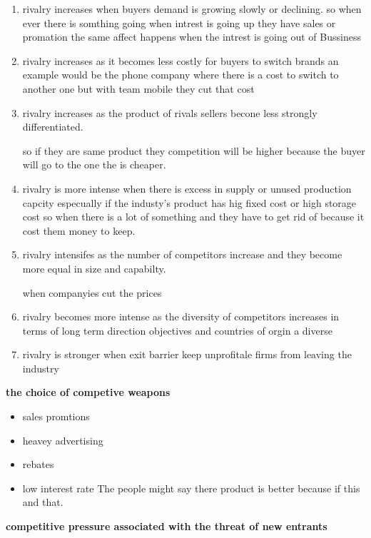 \documentclass{report}
\begin{document}
\begin{enumerate}
\item rivalry increases when buyers demand is growing slowly or declining.
so when ever there is somthing going when intrest is going up they have sales or promation the same affect happens when the intrest is going out of Bussiness 
\item rivalry increases as it becomes less costly for buyers to switch brands 
an example would be the phone company where there is a cost to switch to another one but with team mobile they cut that cost 
\item rivalry increases as the product of rivals sellers becone less strongly differentiated. 

so if they are same product they competition will be higher because the buyer will go to the one the is cheaper. 
\item rivalry is more intense when there is excess in supply or unused production capcity especually if the industy's product has hig fixed cost or high storage cost 
so when there is a lot of something and they have to get rid of because it cost them money to keep. 
\item rivalry intensifes as the number of competitors increase and they become more equal in size and capabilty. 

when companyies cut the prices 
\item rivalry becomes more intense as the diversity of competitors increases in terms  of long term direction objectives and countries of orgin a diverse 

\item rivalry is stronger when exit barrier keep unprofitale firms from leaving the industry 



\end{enumerate}

\textbf{the choice of competive weapons}
\begin{itemize}
\item sales promtions 
\item heavey advertising 
\item rebates 
\item low interest rate 
The people might say there product is better because if this and that. 

\end{itemize}

\large{\textbf{competitive  pressure associated with the threat of new entrants}}
\end{document}
